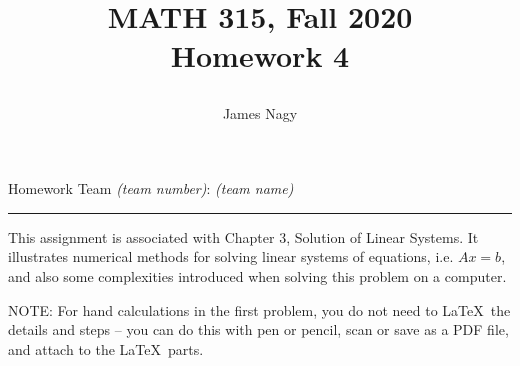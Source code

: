 \documentclass[12pt]{article}
\title{MATH 315, Fall 2020 \\[3pt]
Homework 4
\date{}}
\author{James Nagy}
\begin{document}
\maketitle

\begin{center}
Homework Team \textit{(team number)}: \textit{(team name)} \\
\rule[0pt]{12cm}{1pt}
\end{center}


This assignment is associated with Chapter 3, Solution of Linear Systems. It illustrates numerical methods for solving linear systems of equations, i.e. $A{x}={b}$, and also some complexities introduced when solving this problem on a computer.

NOTE: For hand calculations in the first problem, you do not need to \LaTeX\ the details and steps -- you can do this with pen or pencil, scan or save as a PDF file, and attach to the  \LaTeX\ parts.
%
\end{document}
